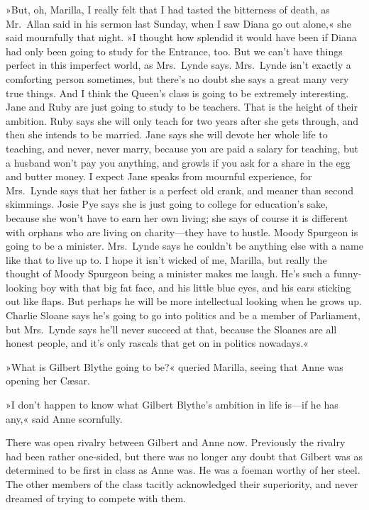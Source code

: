 »But, oh, Marilla, I really felt that I had tasted the bitterness of death, as Mr.~Allan said in his sermon last Sunday, when I saw Diana go out alone,« she said mournfully that night. »I thought how splendid it would have been if Diana had only been going to study for the Entrance, too. But we can't have things perfect in this imperfect world, as Mrs.~Lynde says. Mrs.~Lynde isn't exactly a comforting person sometimes, but there's no doubt she says a great many very true things. And I think the Queen's class is going to be extremely interesting. Jane and Ruby are just going to study to be teachers. That is the height of their ambition. Ruby says she will only teach for two years after she gets through, and then she intends to be married. Jane says she will devote her whole life to teaching, and never, never marry, because you are paid a salary for teaching, but a husband won't pay you anything, and growls if you ask for a share in the egg and butter money. I expect Jane speaks from mournful experience, for Mrs.~Lynde says that her father is a perfect old crank, and meaner than second skimmings. Josie Pye says she is just going to college for education's sake, because she won't have to earn her own living; she says of course it is different with orphans who are living on charity—they have to hustle. Moody Spurgeon is going to be a minister. Mrs.~Lynde says he couldn't be anything else with a name like that to live up to. I hope it isn't wicked of me, Marilla, but really the thought of Moody Spurgeon being a minister makes me laugh. He's such a funny-looking boy with that big fat face, and his little blue eyes, and his ears sticking out like flaps. But perhaps he will be more intellectual looking when he grows up. Charlie Sloane says he's going to go into politics and be a member of Parliament, but Mrs.~Lynde says he'll never succeed at that, because the Sloanes are all honest people, and it's only rascals that get on in politics nowadays.«

»What is Gilbert Blythe going to be?« queried Marilla, seeing that Anne was opening her Cæsar.

»I don't happen to know what Gilbert Blythe's ambition in life is—if he has any,« said Anne scornfully.

There was open rivalry between Gilbert and Anne now. Previously the rivalry had been rather one-sided, but there was no longer any doubt that Gilbert was as determined to be first in class as Anne was. He was a foeman worthy of her steel. The other members of the class tacitly acknowledged their superiority, and never dreamed of trying to compete with them.

